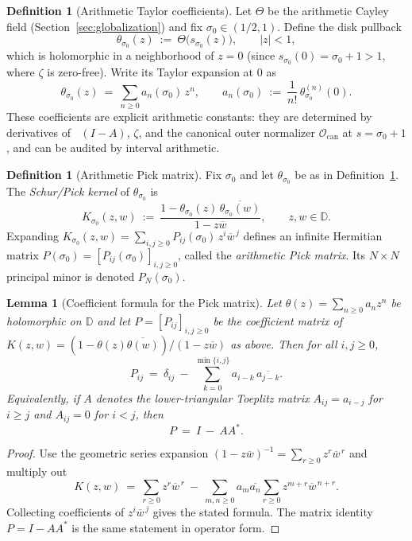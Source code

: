 \documentclass[11pt]{article}
\newtheorem{lemma}[theorem]{Lemma}
\theoremstyle{definition}
\newtheorem{definition}[theorem]{Definition}
\theoremstyle{remark}
\theoremstyle{definition}
\DeclareMathOperator{\dettwo}{det_2}
\begin{document}
\begin{definition}[Arithmetic Taylor coefficients]\label{def:arith-taylor}
Let $\Theta$ be the arithmetic Cayley field (Section~\ref{sec:globalization}) and fix $\sigma_0\in(1/2,1)$.
Define the disk pullback
\[
  \theta_{\sigma_0}(z)\ :=\ \Theta\!\big(s_{\sigma_0}(z)\big),
  \qquad |z|<1,
\]
which is holomorphic in a neighborhood of $z=0$ (since $s_{\sigma_0}(0)=\sigma_0+1>1$, where $\zeta$ is zero-free).
Write its Taylor expansion at $0$ as
\[
  \theta_{\sigma_0}(z)\ =\ \sum_{n\ge 0} a_n(\sigma_0)\,z^n,\qquad
  a_n(\sigma_0)\ :=\ \frac{1}{n!}\,\theta_{\sigma_0}^{(n)}(0).
\]
These coefficients are explicit arithmetic constants: they are determined by derivatives of $\dettwo(I-A)$, $\zeta$, and the canonical outer normalizer $\mathcal O_{\mathrm{can}}$ at $s=\sigma_0+1$, and can be audited by interval arithmetic.
\end{definition}

\begin{definition}[Arithmetic Pick matrix]\label{def:arith-pick-matrix}
Fix $\sigma_0$ and let $\theta_{\sigma_0}$ be as in Definition~\ref{def:arith-taylor}.
The \emph{Schur/Pick kernel} of $\theta_{\sigma_0}$ is
\[
  K_{\sigma_0}(z,w)\ :=\ \frac{1-\theta_{\sigma_0}(z)\,\overline{\theta_{\sigma_0}(w)}}{1-z\overline w},
  \qquad z,w\in\mathbb D.
\]
Expanding $K_{\sigma_0}(z,w)=\sum_{i,j\ge 0} P_{ij}(\sigma_0)\,z^i\overline w^{\,j}$ defines an infinite Hermitian matrix
$P(\sigma_0)=[P_{ij}(\sigma_0)]_{i,j\ge 0}$, called the \emph{arithmetic Pick matrix}.
Its $N\times N$ principal minor is denoted $P_N(\sigma_0)$.
\end{definition}

\begin{lemma}[Coefficient formula for the Pick matrix]\label{lem:pick-matrix-coeff-formula}
Let $\theta(z)=\sum_{n\ge 0} a_n z^n$ be holomorphic on $\mathbb D$ and let $P=[P_{ij}]_{i,j\ge 0}$ be the coefficient matrix of
$K(z,w)=(1-\theta(z)\overline{\theta(w)})/(1-z\overline w)$ as above.
Then for all $i,j\ge 0$,
\[
  P_{ij}\ =\ \delta_{ij}\ -\ \sum_{k=0}^{\min\{i,j\}} a_{i-k}\,\overline{a_{j-k}}.
\]
Equivalently, if $A$ denotes the lower-triangular Toeplitz matrix $A_{ij}=a_{i-j}$ for $i\ge j$ and $A_{ij}=0$ for $i<j$, then
\[
  P\ =\ I\ -\ A A^*.
\]
\end{lemma}
\begin{proof}
Use the geometric series expansion $(1-z\overline w)^{-1}=\sum_{r\ge 0} z^r\overline w^{\,r}$ and multiply out
\[
  K(z,w)\ =\ \sum_{r\ge 0} z^r\overline w^{\,r}\ -\ \sum_{m,n\ge 0} a_m\overline{a_n}\sum_{r\ge 0} z^{m+r}\overline w^{\,n+r}.
\]
Collecting coefficients of $z^i\overline w^{\,j}$ gives the stated formula. The matrix identity $P=I-AA^*$ is the same statement in operator form.
\end{proof}
\end{document}
